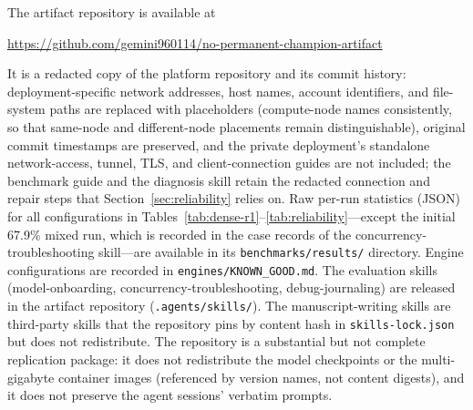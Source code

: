 \documentclass[11pt]{article}
\begin{document}
The artifact repository is available at
\begin{center}\url{https://github.com/gemini960114/no-permanent-champion-artifact}\end{center}
\noindent It is a redacted copy of the platform repository and its commit history: deployment-specific network addresses, host names, account identifiers, and file-system paths are replaced with placeholders (compute-node names consistently, so that same-node and different-node placements remain distinguishable), original commit timestamps are preserved, and the private deployment's standalone network-access, tunnel, TLS, and client-connection guides are not included; the benchmark guide and the diagnosis skill retain the redacted connection and repair steps that Section~\ref{sec:reliability} relies on. Raw per-run statistics (JSON) for all configurations in Tables~\ref{tab:dense-r1}--\ref{tab:reliability}---except the initial 67.9\% mixed run, which is recorded in the case records of the concurrency-troubleshooting skill---are available in its \texttt{benchmarks/\allowbreak results/} directory. Engine configurations are recorded in \texttt{engines/KNOWN\_GOOD.md}. The evaluation skills (model-onboarding, concurrency-troubleshooting, debug-journaling) are released in the artifact repository (\texttt{.agents/skills/}). The manuscript-writing skills are third-party skills that the repository pins by content hash in \texttt{skills-lock.json} but does not redistribute. The repository is a substantial but not complete replication package: it does not redistribute the model checkpoints or the multi-gigabyte container images (referenced by version names, not content digests), and it does not preserve the agent sessions' verbatim prompts.



\end{document}
